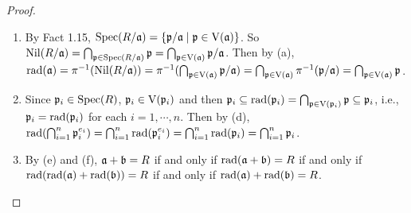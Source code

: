 \begin{proof}
\begin{enumerate}
        \item
            By Fact 1.15, $\operatorname{Spec}(R/\mathfrak{a}) = \{\mathfrak{p}/\mathfrak{a} \mid \mathfrak{p} \in \operatorname{V}(\mathfrak{a})\}$. So $\operatorname{Nil}(R/\mathfrak{a}) = \bigcap_{\mathfrak{p} \in \operatorname{Spec}(R/\mathfrak{a})} \mathfrak{p} = \bigcap_{\mathfrak{p} \in \operatorname{V}(\mathfrak{a})} \mathfrak{p}/\mathfrak{a}$. Then by (a), $\operatorname{rad}(\mathfrak{a}) = \pi^{-1}(\operatorname{Nil}(R/\mathfrak{a}))  = \pi^{-1}(\bigcap_{\mathfrak{p} \in \operatorname{V}(\mathfrak{a})} \mathfrak{p}/\mathfrak{a}) = \bigcap_{\mathfrak{p} \in \operatorname{V}(\mathfrak{a})} \pi^{-1}(\mathfrak{p}/\mathfrak{a}) = \bigcap_{\mathfrak{p} \in \operatorname{V}(\mathfrak{a})} \mathfrak{p}$.
        \item Since $\mathfrak{p}_i \in \operatorname{Spec}(R)$, $\mathfrak{p}_i \in \operatorname{V}(\mathfrak{p}_i)$ and then $\mathfrak{p}_i \subseteq \operatorname{rad}(\mathfrak{p}_i) = \bigcap_{\mathfrak{p} \in \operatorname{V}(\mathfrak{p}_i)}\mathfrak{p} \subseteq \mathfrak{p}_i$, i.e., $\mathfrak{p}_i = \operatorname{rad}(\mathfrak{p}_i)$ for each $i = 1,\cdots,n$. Then by (d), $\operatorname{rad}(\bigcap_{i=1}^n \mathfrak{p}_i^{e_i}) = \bigcap_{i=1}^n \operatorname{rad}(\mathfrak{p}_i^{e_i}) = \bigcap_{i=1}^n \operatorname{rad}(\mathfrak{p}_i) = \bigcap_{i=1}^n \mathfrak{p}_i$. 
        \item
            By (e) and (f), $\mathfrak{a} + \mathfrak{b} = R$ if and only if $\operatorname{rad}(\mathfrak{a} + \mathfrak{b}) = R$ if and only if $\operatorname{rad}(\operatorname{rad}(\mathfrak{a}) + \operatorname{rad}(\mathfrak{b})) = R$ if and only if $\operatorname{rad}(\mathfrak{a}) + \operatorname{rad}(\mathfrak{b}) = R$. \qedhere
    \end{enumerate}
\end{proof}


